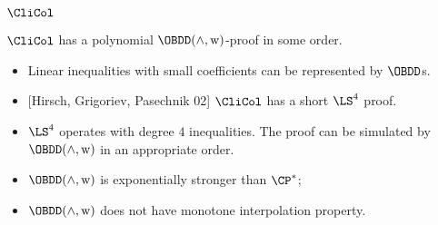 \begin{frame}{$\CliCol$}

    \begin{theorem}
        $\CliCol$ has a polynomial $\OBDD(\land, \weakening)$-proof in some order.
    \end{theorem}

    \pause

    \begin{itemize}
        \item Linear inequalities with small coefficients can be represented by $\OBDD$s.
        \pause
        \item{} [Hirsch, Grigoriev, Pasechnik 02] $\CliCol$ has a short $\LS^4$ proof.
        \pause
        \item $\LS^4$ operates with degree $4$ inequalities. The proof can be simulated by $\OBDD(\land,
            \weakening)$ in an appropriate order.
    \end{itemize}

    \pause
    \begin{corollary}
        \begin{itemize}
            \item $\OBDD(\land, \weakening)$ is exponentially stronger than $\CP^*$;
            \item $\OBDD(\land, \weakening)$ does not have monotone interpolation property.
        \end{itemize}
    \end{corollary}
\end{frame}


